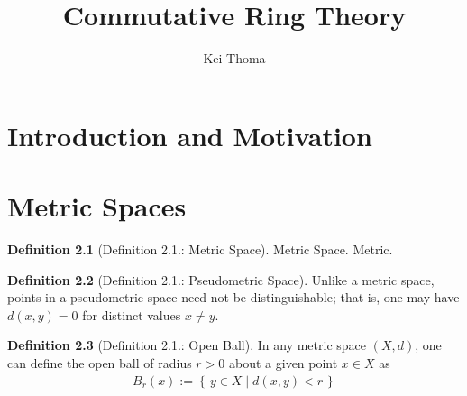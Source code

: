 \documentclass[a4paper]{book}
\title{Commutative Ring Theory}
\author{Kei Thoma}
\theoremstyle{definition}
\newtheorem{definition}{Definition}[]
\newcommand{\makeset}[2]{\left\{\, #1 \mid #2 \,\right\}}
\begin{document}
\maketitle
\tableofcontents
\chapter{Introduction and Motivation}
\chapter{Metric Spaces}

\begin{defbox}
    \begin{definition}[Definition 2.1.: Metric Space]
        Metric Space. Metric.
    \end{definition}
\end{defbox}

\begin{defbox}
    \begin{definition}[Definition 2.1.: Pseudometric Space]
        Unlike a metric space, points in a pseudometric space need not be distinguishable; that is, one may have \(d(x, y) = 0\) for distinct values \(x \neq y\).
    \end{definition}
\end{defbox}

\begin{defbox}
    \begin{definition}[Definition 2.1.: Open Ball]
        In any metric space \((X, d)\), one can define the open ball of radius \(r > 0\) about a given point \(x \in X\) as
        \begin{align*}
            B_r(x) := \makeset{y \in X}{d(x, y) < r}
        \end{align*}
    \end{definition}
\end{defbox}
\end{document}
